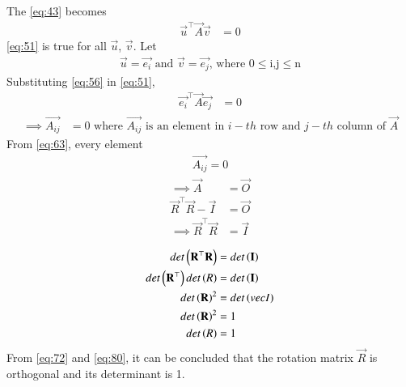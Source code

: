 \documentclass[journal]{IEEEtran}
\begin{document}
The \eqref{eq:43} becomes
\begin{align}
    \vec{u}^\top\vec{A}\vec{v} &= 0 \label{eq:51}
\end{align}
\eqref{eq:51} is true for all $\vec{u}$, $\vec{v}$.
Let
\begin{align}
    \vec{u} = \vec{e_i}\text{ and }\vec{v} = \vec{e_j}\text{, where 0$\leq$i,j$\leq$n} \label{eq:56}
\end{align}
Substituting \eqref{eq:56} in \eqref{eq:51},
\begin{align}
    \vec{e_i}^\top\vec{A}\vec{e_j} &= 0
\end{align}
\begin{align}
    \implies \vec{A_{ij}} &= 0\text{ where $\vec{A_{ij}}$ is an element in $i-th$ row and $j-th$ column of $\vec{A}$} \label{eq:63}
\end{align}
From \eqref{eq:63}, every element 
\begin{align}
    \vec{A_{ij}} = 0
\end{align}
\begin{align}
    \implies \vec{A} &= \vec{O} \\
    \vec{R}^\top\vec{R} - \vec{I} &= \vec{O} \\
    \implies \vec{R}^\top\vec{R} &= \vec{I} \label{eq:72}
\end{align}

\begin{align}
    det\left(\mathbf{R}^\top\mathbf{R}\right) &= det\left(\mathbf{I}\right) \\
    det\left(\mathbf{R}^\top\right)det\left(R\right) &= det\left(\mathbf{I}\right) \\
    det\left(\mathbf{R}\right)^2 &= det\left(vec{I}\right) \\
    det\left(\mathbf{R}\right)^2 &= 1 \\
    det\left(R\right) &= 1 \label{eq:80}
\end{align}
From \eqref{eq:72} and \eqref{eq:80}, it can be concluded that the rotation matrix $\vec{R}$ is orthogonal and its determinant is 1.
\end{document}
